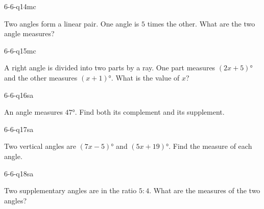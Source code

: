 \begin{practiceQuestion}{6-6-q14}{mc}
\begin{questionText}
Two angles form a linear pair. One angle is $5$ times the other. What are the two angle measures?
\end{questionText}
\end{practiceQuestion}

\begin{practiceQuestion}{6-6-q15}{mc}
\begin{questionText}
A right angle is divided into two parts by a ray. One part measures $(2x + 5)°$ and the other measures $(x + 1)°$. What is the value of $x$?
\end{questionText}
\end{practiceQuestion}


\begin{practiceQuestion}{6-6-q16}{sa}
\begin{questionText}
An angle measures $47°$. Find both its complement and its supplement.
\end{questionText}
\end{practiceQuestion}

\begin{practiceQuestion}{6-6-q17}{sa}
\begin{questionText}
Two vertical angles are $(7x - 5)°$ and $(5x + 19)°$. Find the measure of each angle.
\end{questionText}
\end{practiceQuestion}

\begin{practiceQuestion}{6-6-q18}{sa}
\begin{questionText}
Two supplementary angles are in the ratio $5:4$. What are the measures of the two angles?
\end{questionText}
\end{practiceQuestion}

